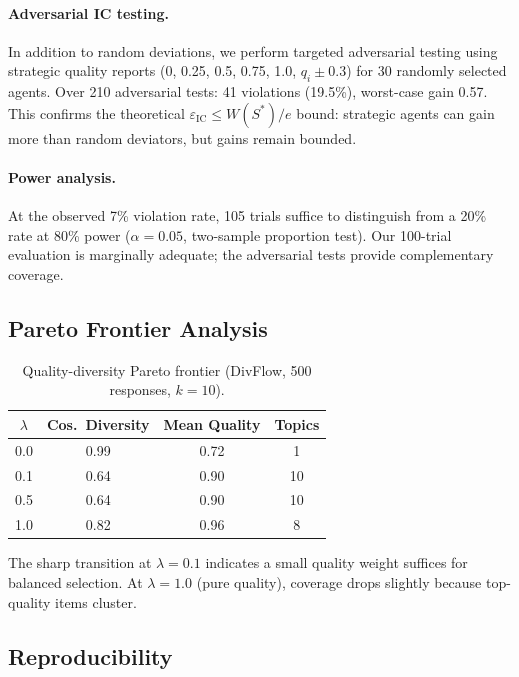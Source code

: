 \documentclass[10pt]{article}
\begin{document}
\paragraph{Adversarial IC testing.}
In addition to random deviations, we perform targeted adversarial testing using strategic quality reports (0, 0.25, 0.5, 0.75, 1.0, $q_i \pm 0.3$) for 30 randomly selected agents.
Over 210 adversarial tests: 41 violations (19.5\%), worst-case gain 0.57.
This confirms the theoretical $\varepsilon_{\mathrm{IC}} \leq W(S^*)/e$ bound: strategic agents can gain more than random deviators, but gains remain bounded.

\paragraph{Power analysis.}
At the observed 7\% violation rate, 105 trials suffice to distinguish from a 20\% rate at 80\% power ($\alpha = 0.05$, two-sample proportion test).
Our 100-trial evaluation is marginally adequate; the adversarial tests provide complementary coverage.

\subsection{Pareto Frontier Analysis}

\begin{table}[H]
\centering
\caption{Quality-diversity Pareto frontier (DivFlow, 500 responses, $k{=}10$).}
\label{tab:pareto}
\begin{tabular}{cccc}
\toprule
$\lambda$ & \textbf{Cos.\ Diversity} & \textbf{Mean Quality} & \textbf{Topics} \\
\midrule
0.0 & 0.99 & 0.72 & 1 \\
0.1 & 0.64 & 0.90 & 10 \\
0.5 & 0.64 & 0.90 & 10 \\
1.0 & 0.82 & 0.96 & 8 \\
\bottomrule
\end{tabular}
\end{table}

The sharp transition at $\lambda = 0.1$ indicates a small quality weight suffices for balanced selection.
At $\lambda = 1.0$ (pure quality), coverage drops slightly because top-quality items cluster.

\subsection{Reproducibility}
\end{document}
